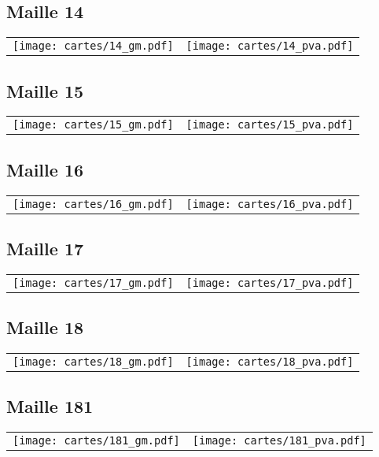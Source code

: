 \subsection{Maille 14}
\begin{tabular}{ll}
\texttt{[image: cartes/14\_gm.pdf]}
&
\texttt{[image: cartes/14\_pva.pdf]}
\end{tabular}
\newpage
\subsection{Maille 15}
\begin{tabular}{ll}
\texttt{[image: cartes/15\_gm.pdf]}
&
\texttt{[image: cartes/15\_pva.pdf]}
\end{tabular}
\newpage
\subsection{Maille 16}
\begin{tabular}{ll}
\texttt{[image: cartes/16\_gm.pdf]}
&
\texttt{[image: cartes/16\_pva.pdf]}
\end{tabular}
\newpage
\subsection{Maille 17}
\begin{tabular}{ll}
\texttt{[image: cartes/17\_gm.pdf]}
&
\texttt{[image: cartes/17\_pva.pdf]}
\end{tabular}
\newpage
\subsection{Maille 18}
\begin{tabular}{ll}
\texttt{[image: cartes/18\_gm.pdf]}
&
\texttt{[image: cartes/18\_pva.pdf]}
\end{tabular}
\newpage
\subsection{Maille 181}
\begin{tabular}{ll}
\texttt{[image: cartes/181\_gm.pdf]}
&
\texttt{[image: cartes/181\_pva.pdf]}
\end{tabular}
\newpage
